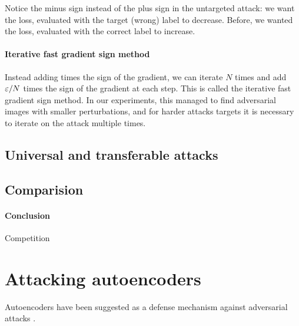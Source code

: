 \documentclass[]{scrarticle}
\begin{document}
Notice the minus sign instead of the plus sign in the untargeted attack:
we want the loss, evaluated with the target (wrong) label
to decrease. Before, we wanted the loss, evaluated with the correct label
to increase.

\paragraph{Iterative fast gradient sign method}
Instead adding \e times the sign of the gradient, we can iterate
$N$ times and add $\varepsilon / N$ times the sign of the gradient at each step.
This is called the iterative fast gradient sign method.
In our experiments, this managed to find adversarial images with
smaller perturbations, and for harder attacks targets it
is necessary to iterate on the attack multiple times.




\subsection{Universal and transferable attacks}

\subsection{Comparision}


\paragraph{Conclusion}

Competition \cite{Kurakin2018AdversarialAA}









\newpage

\section{Attacking autoencoders}

Autoencoders have been suggested as a defense mechanism against adversarial attacks
\cite{guo2017countering,liu2017enhanced,liu2018feature}.
\end{document}
